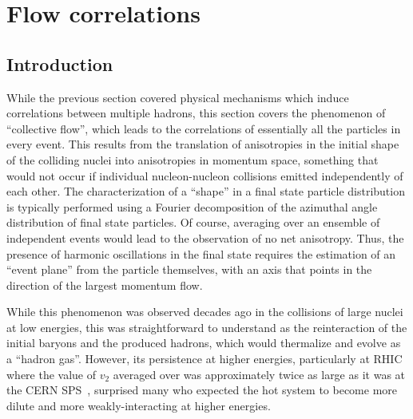 \section{Flow correlations}
\label{sec:ps:flow}
\subsection{Introduction}
While the previous section covered physical mechanisms which induce
correlations between multiple hadrons, this section covers the
phenomenon of ``collective flow'', which leads to the correlations of
essentially all the particles in every event.
This results from the translation of anisotropies in the initial shape of the
colliding nuclei into anisotropies in momentum space, something that
would not occur if individual nucleon-nucleon collisions emitted independently
of each other.
The characterization of a ``shape'' in a final state particle distribution
is typically performed using a Fourier decomposition of the azimuthal
angle distribution of final state particles.
Of course, averaging over an ensemble of independent events would lead to
the observation of no net anisotropy.  Thus, the presence of harmonic
oscillations in the final state requires the estimation of an ``event plane''
from the particle themselves, with an axis that points in the direction of
the largest momentum flow.

While this phenomenon was observed decades ago in the collisions of large
nuclei at low energies, this was straightforward to understand as the
reinteraction of the initial baryons and the produced hadrons, which
would thermalize and evolve as a ``hadron gas''.
However, its persistence at higher energies, particularly at RHIC where the
value of $v_2$ averaged over \pT was approximately twice as large as it was at the
CERN SPS~\cite{Ackermann:2000tr}, surprised many who expected the hot system to become more
dilute and more weakly-interacting at higher energies.

